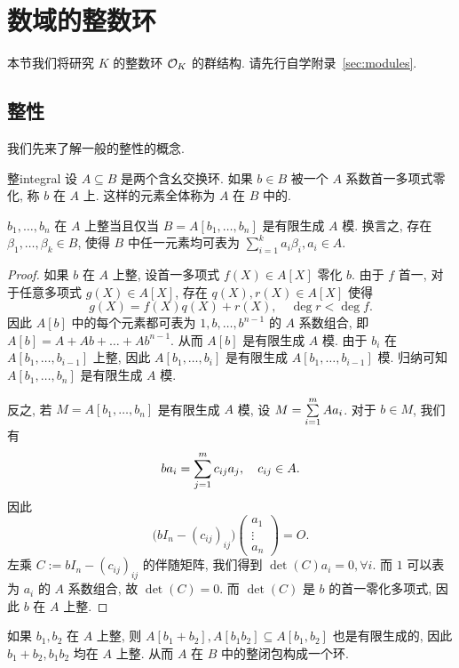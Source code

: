 \section{数域的整数环}
\label{ring of intergers}
本节我们将研究 $K$ 的整数环 ${\mathcal{O}}_K$ 的群结构. 请先行自学附录~\ref{sec:modules}.

\subsection{整性}
我们先来了解一般的整性的概念.
\begin{definition}{整}{integral}
设 $A\subseteq B$ 是两个含幺交换环. 如果 $b\in B$ 被一个 $A$ 系数首一多项式零化, 称 $b$ 在 $A$ 上. 这样的元素全体称为 $A$ 在 $B$ 中的.
\end{definition}

\begin{proposition}{}{}
$b_1,\dots,b_n$ 在 $A$ 上整当且仅当 $B=A[b_1,\dots,b_n]$ 是有限生成 $A$ 模.
换言之, 存在 $\beta_1,\dots,\beta_k\in B$, 使得 $B$ 中任一元素均可表为 $\sum_{i=1}^k a_i\beta_i,a_i\in A$.
\end{proposition}
\begin{proof}
如果 $b$ 在 $A$ 上整, 设首一多项式 $f(X)\in A[X]$ 零化 $b$. 由于 $f$ 首一, 对于任意多项式 $g(X)\in A[X]$, 存在 $q(X),r(X)\in A[X]$ 使得
  \[g(X)=f(X)q(X)+r(X),\quad \deg r< \deg f.\]
因此 $A[b]$ 中的每个元素都可表为 $1,b,\dots,b^{n-1}$ 的 $A$ 系数组合, 即 $A[b]=A+Ab+\dots+Ab^{n-1}$. 从而 $A[b]$ 是有限生成 $A$ 模. 由于 $b_i$ 在 $A[b_1,\dots,b_{i-1}]$ 上整, 因此 $A[b_1,\dots,b_i]$ 是有限生成 $A[b_1,\dots,b_{i-1}]$ 模. 归纳可知 $A[b_1,\dots,b_n]$ 是有限生成 $A$ 模.

反之, 若 $M=A[b_1,\dots,b_n]$ 是有限生成 $A$ 模, 设 $M=\sum\limits_{i=1}^m A a_i$. 对于 $b\in M$, 我们有
  \[b a_i=\sum\limits_{j=1}^m c_{ij} a_j,\quad c_{ij}\in A.\]
因此 
	\[\bigl(bI_n-(c_{ij})_{ij}\bigr)\begin{pmatrix}
		a_1\\ \vdots \\ a_n 
	\end{pmatrix}=O.\]
左乘 $C:=bI_n-(c_{ij})_{ij}$ 的伴随矩阵, 我们得到 $\det(C)a_i=0,\forall i$. 而 $1$ 可以表为 $a_i$ 的 $A$ 系数组合, 故 $\det(C)=0$. 而 $\det(C)$ 是 $b$ 的首一零化多项式, 因此 $b$ 在 $A$ 上整.
\end{proof}

如果 $b_1,b_2$ 在 $A$ 上整, 则 $A[b_1+b_2],A[b_1b_2]\subseteq A[b_1,b_2]$ 也是有限生成的, 因此 $b_1+b_2,b_1b_2$ 均在 $A$ 上整.
从而 $A$ 在 $B$ 中的整闭包构成一个环.

